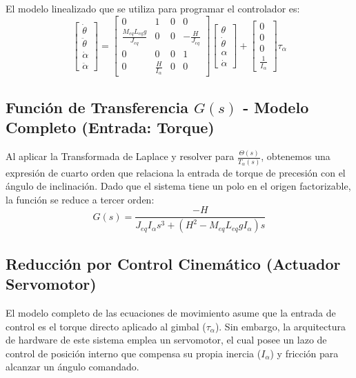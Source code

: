 \documentclass[12pt,letterpaper]{report}
\begin{document}
El modelo linealizado que se utiliza para programar el controlador es:
\begin{equation}
    \begin{bmatrix} \dot{\theta} \\ \ddot{\theta} \\ \dot{\alpha} \\ \ddot{\alpha} \end{bmatrix} = 
    \begin{bmatrix} 0 & 1 & 0 & 0 \\ \frac{M_{eq}L_{eq}g}{J_{eq}} & 0 & 0 & -\frac{H}{J_{eq}} \\ 0 & 0 & 0 & 1 \\ 0 & \frac{H}{I_\alpha} & 0 & 0 \end{bmatrix}
    \begin{bmatrix} \theta \\ \dot{\theta} \\ \alpha \\ \dot{\alpha} \end{bmatrix} + 
    \begin{bmatrix} 0 \\ 0 \\ 0 \\ \frac{1}{I_\alpha} \end{bmatrix} \tau_\alpha
\end{equation}

\subsection*{Función de Transferencia \texorpdfstring{$G(s)$}{G(s)} - Modelo Completo (Entrada: Torque)}

Al aplicar la Transformada de Laplace y resolver para $\frac{\Theta(s)}{T_\alpha(s)}$, obtenemos una expresión de cuarto orden que relaciona la entrada de torque de precesión con el ángulo de inclinación. Dado que el sistema tiene un polo en el origen factorizable, la función se reduce a tercer orden:
\begin{equation}
    G(s) = \frac{-H}{J_{eq}I_\alpha s^3 + (H^2 - M_{eq}L_{eq}g I_\alpha)s}
\end{equation}

\subsection*{Reducción por Control Cinemático (Actuador Servomotor)}

El modelo completo de las ecuaciones de movimiento asume que la entrada de control es el torque directo aplicado al gimbal ($\tau_\alpha$). Sin embargo, la arquitectura de hardware de este sistema emplea un servomotor, el cual posee un lazo de control de posición interno que compensa su propia inercia ($I_\alpha$) y fricción para alcanzar un ángulo comandado.
\end{document}
